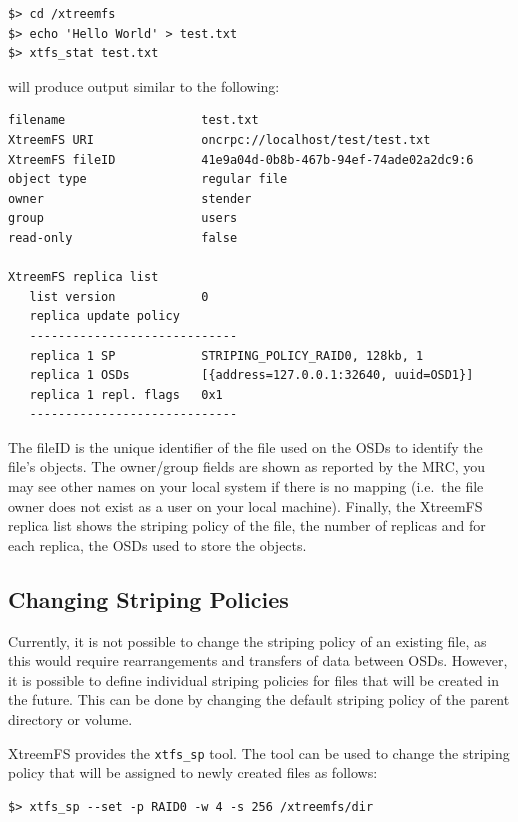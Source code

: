 \documentclass[a4paper,10pt]{book}
\begin{document}
\begin{verbatim}
$> cd /xtreemfs
$> echo 'Hello World' > test.txt
$> xtfs_stat test.txt
\end{verbatim}


will produce output similar to the following:


\begin{verbatim}
filename                   test.txt
XtreemFS URI               oncrpc://localhost/test/test.txt
XtreemFS fileID            41e9a04d-0b8b-467b-94ef-74ade02a2dc9:6
object type                regular file
owner                      stender
group                      users
read-only                  false

XtreemFS replica list
   list version            0
   replica update policy
   -----------------------------
   replica 1 SP            STRIPING_POLICY_RAID0, 128kb, 1
   replica 1 OSDs          [{address=127.0.0.1:32640, uuid=OSD1}]
   replica 1 repl. flags   0x1
   -----------------------------
\end{verbatim}


The fileID  is the unique identifier of the file used on the OSDs to identify the file's objects. The owner/group fields are shown as reported by the MRC, you may see other names on your local system if there is no mapping (i.e.\ the file owner does not exist as a user on your local machine).
Finally, the XtreemFS replica list shows the striping policy of the file, the number of replicas and for each replica, the OSDs used to store the objects.


\subsection{Changing Striping Policies}

Currently, it is not possible to change the striping policy of an existing file, as this would require rearrangements and transfers of data between OSDs. However, it is possible to define individual striping policies for files that will be created in the future. This can be done by changing the default striping policy of the parent directory or volume.

XtreemFS provides the \texttt{xtfs\_sp} tool. The tool can be used to change the striping policy that will be assigned to newly created files as follows:

\begin{verbatim}
$> xtfs_sp --set -p RAID0 -w 4 -s 256 /xtreemfs/dir
\end{verbatim}
\end{document}
